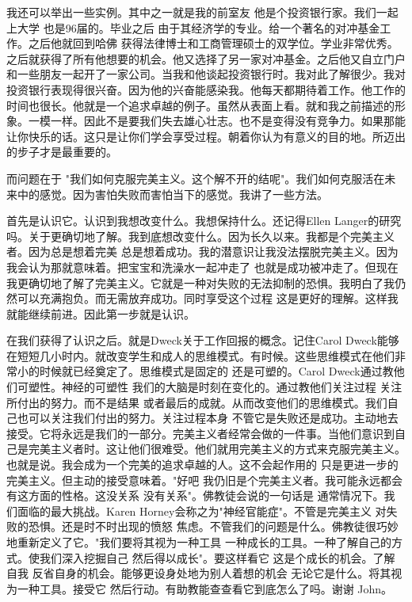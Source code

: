 我还可以举出一些实例。其中之一就是我的前室友 他是个投资银行家。我们一起上大学 也是96届的。毕业之后 由于其经济学的专业。给一个著名的对冲基金工作。之后他就回到哈佛 获得法律博士和工商管理硕士的双学位。学业非常优秀。之后就获得了所有他想要的机会。他又选择了另一家对冲基金。之后他又自立门户 和一些朋友一起开了一家公司。当我和他谈起投资银行时。我对此了解很少。我对投资银行表现得很兴奋。因为他的兴奋能感染我。他每天都期待着工作。他工作的时间也很长。他就是一个追求卓越的例子。虽然从表面上看。就和我之前描述的形象。一模一样。因此不是要我们失去雄心壮志。也不是变得没有竞争力。如果那能让你快乐的话。这只是让你们学会享受过程。朝着你认为有意义的目的地。所迈出的步子才是最重要的。 

而问题在于 "我们如何克服完美主义。这个解不开的结呢"。我们如何克服活在未来中的感觉。因为害怕失败而害怕当下的感觉。我讲了一些方法。 

首先是认识它。认识到我想改变什么。我想保持什么。还记得Ellen Langer的研究吗。关于更确切地了解。我到底想改变什么。因为长久以来。我都是个完美主义者。因为总是想着完美 总是想着成功。我的潜意识让我没法摆脱完美主义。因为我会认为那就意味着。把宝宝和洗澡水一起冲走了 也就是成功被冲走了。但现在我更确切地了解了完美主义。它就是一种对失败的无法抑制的恐惧。我明白了我仍然可以充满抱负。而无需放弃成功。同时享受这个过程 这是更好的理解。这样我就能继续前进。因此第一步就是认识。 

在我们获得了认识之后。就是Dweck关于工作回报的概念。记住Carol Dweck能够在短短几小时内。就改变学生和成人的思维模式。有时候。这些思维模式在他们非常小的时候就已经奠定了。思维模式是固定的 还是可塑的。Carol Dweck通过教他们可塑性。神经的可塑性 我们的大脑是时刻在变化的。通过教他们关注过程 关注所付出的努力。而不是结果 或者最后的成就。从而改变他们的思维模式。我们自己也可以关注我们付出的努力。关注过程本身 不管它是失败还是成功。主动地去接受。它将永远是我们的一部分。完美主义者经常会做的一件事。当他们意识到自己是完美主义者时。这让他们很难受。他们就用完美主义的方式来克服完美主义。也就是说。我会成为一个完美的追求卓越的人。这不会起作用的 只是更进一步的完美主义。但主动的接受意味着。"好吧 我仍旧是个完美主义者。我可能永远都会有这方面的性格。这没关系 没有关系"。佛教徒会说的一句话是 通常情况下。我们面临的最大挑战。Karen Horney会称之为"神经官能症"。不管是完美主义 对失败的恐惧。还是时不时出现的愤怒 焦虑。不管我们的问题是什么。佛教徒很巧妙地重新定义了它。"我们要将其视为一种工具 一种成长的工具。一种了解自己的方式。使我们深入挖掘自己 然后得以成长"。要这样看它 这是个成长的机会。了解自我 反省自身的机会。能够更设身处地为别人着想的机会 无论它是什么。将其视为一种工具。接受它 然后行动。有助教能查查看它到底怎么了吗。谢谢 John。 

